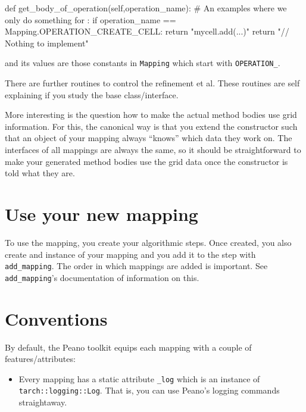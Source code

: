 \begin{code}
  def get_body_of_operation(self,operation_name):
    # An examples where we only do something for :
    if operation_name == Mapping.OPERATION_CREATE_CELL:
      return "mycell.add(...)\n"
    return "// Nothing to implement\n"
\end{code}

\noindent
and its values are those constants in \texttt{Mapping} which start with
\texttt{OPERATION\_}.


There are further routines to control the refinement et al.
These routines are self explaining if you study the base class/interface.


More interesting is the question how to make the actual method bodies use grid
information.
For this, the canonical way is that you extend the constructor such that an
object of your mapping always ``knows'' which data they work on. 
The interfaces of all mappings are always the same, so it should be
straightforward to make your generated method bodies use the grid data once the
constructor is told what they are.


\section{Use your new mapping}

To use the mapping, you create your algorithmic steps.
Once created, you also create and instance of your mapping and you add it to the
step with \texttt{add\_mapping}.
The order in which mappings are added is important.
See \texttt{add\_mapping}'s documentation of information on this.



\section{Conventions}

By default, the Peano toolkit equips each mapping with a couple of
features/attributes:

\begin{itemize}
  \item Every mapping has a static attribute \texttt{\_log} which is an instance
  of \texttt{tarch::logging::Log}. That is, you can use Peano's logging commands
  straightaway.
\end{itemize}

